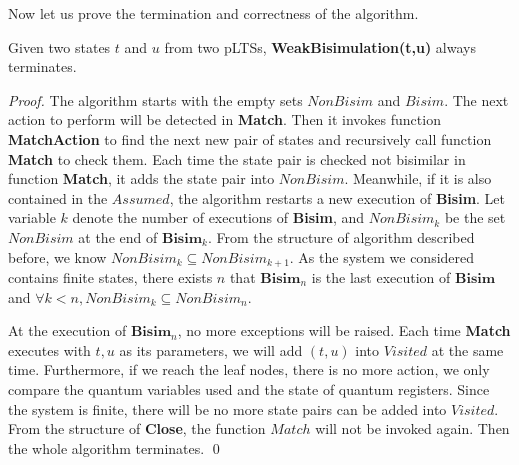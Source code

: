 \documentclass[a4paper,runningheads]{llncs}
\begin{document}
Now let us prove the termination and correctness of the algorithm. 


\begin{theorem}[Termination]\label{thm:termination}
Given two states $t$ and $u$ from two pLTSs, \textbf{WeakBisimulation(t,u)} always terminates.
\end{theorem}
\begin{proof}
The algorithm starts with the empty sets $NonBisim$ and $Bisim$. The next action to perform will be detected in \textbf{Match}. Then it invokes function \textbf{MatchAction} to find the next new pair of states and recursively call function \textbf{Match} to check them. Each time the state pair is checked not bisimilar in function \textbf{Match}, it adds the state pair into $NonBisim$. Meanwhile, if it is also contained in the $Assumed$, the algorithm restarts a new execution of \textbf{Bisim}. Let variable $k$ denote the number of executions of \textbf{Bisim}, and $NonBisim_{k}$ be the set $NonBisim$ at the end of $\textbf{Bisim}_{k}$. From the structure of algorithm described before, we know $NonBisim_{k}\subseteq NonBisim_{k+1}$. As the system we considered contains finite states, there exists $n$ that $\textbf{Bisim}_{n}$ is the last execution of $\textbf{Bisim}$ and $\forall k<n, NonBisim_{k}\subseteq NonBisim_{n}$.

At the execution of $\textbf{Bisim}_{n}$, no more exceptions will be raised. Each time \textbf{Match} executes with $t,u$ as its parameters, we will add $(t,u)$ into $Visited$ at the same time. Furthermore, if we reach the leaf nodes, there is no more action, we only compare the quantum variables used and the state of quantum registers. Since the system is finite, there will be no more state pairs can be added into $Visited$. From the structure of \textbf{Close}, the function $Match$ will not be invoked again.  Then the whole algorithm terminates.
\qed
\end{proof}
\end{document}
